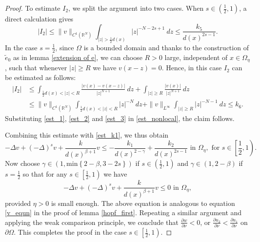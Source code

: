 \documentclass[reqno,oneside]{amsart}
\theoremstyle{definition}
\theoremstyle{remark}
\numberwithin{equation}{section}
\newcommand{\ba}{\beta}
\newcommand{\Om} {\Omega}
\newcommand{\pa}{\partial}
\newcommand{\sr}{\mathbb{R}}
\newcommand{\De} {\Delta}
\begin{document}
\begin{proof}
    To estimate $I_2$, we split the argument into two cases. When $s\in \left(\frac{1}{2},1\right)$, a direct calculation gives
    \begin{equation}\label{est_2}
        |I_2| \leq \|v\|_{C^1(\sr^N)} \int_{|z|>\frac{1}{2}d(x)} |z|^{-N-2s+1}\ dz \leq \frac{k_5}{d(x)^{2s-1}}.
    \end{equation}
    In the case $s= \frac{1}{2}$, since $\Om$ is a bounded domain and thanks to the construction of $\tilde{e}_0$ as in lemma \ref{extension of e}, we can choose $R>0$ large, independent of $x\in\Om_{\eta}$, such that whenever $|z|\geq R$ we have $v(x-z)=0$. Hence, in this case $I_2$ can be estimated as follows:
    \begin{align}\label{est_3}
        |I_2| &\leq \int_{\frac{1}{2}d(x) < |z| < R} \frac{|v(x) - v(x-z)|}{|z|^{N+1}}\ dz + \int_{|z|\geq R} \frac{|v(x)|}{|z|^{N+1}}\ dz\nonumber\\
        &\leq \|v\|_{C^1 (\sr^N)} \int_{\frac{1}{2}d(x) < |z| <R} |z|^{-N}\ dz + \|v\|_{L^{\infty}} \int_{|z|\geq R} |z|^{-N-1}\ dz \leq k_6.
    \end{align}
    Substituting \eqref{est_1}, \eqref{est_2} and \eqref{est_3} in \eqref{est_nonlocal}, the claim follows.

    Combining this estimate with \eqref{est_k1}, we thus obtain
    \begin{equation}\label{v_equn_second}
        -\Delta v + (-\De)^s v + \frac{k}{d(x)^{\ba +1}} v \leq - \frac{k_1}{d(x)^{2-\gamma}} + \frac{k_2}{d(x)^{2s-1}} \text{ in } \Om_{\eta}, \text{ for } s\in \left[\frac{1}{2},1 \right).
    \end{equation}
    Now choose $\gamma \in \left(1, \text{min} \left\{ 2-\beta, 3-2s \right\} \right)$ if $s\in \left(\frac{1}{2},1 \right)$ and $\gamma \in (1, 2- \ba)$ if $s= \frac{1}{2}$ so that for any $s\in \left[ \frac{1}{2}, 1 \right)$ we have
    \begin{equation}\label{v_equn_third}
        -\Delta v + (-\De)^s v + \frac{k}{d(x)^{\ba +1}} v \leq 0 \text{ in } \Om_{\eta},
    \end{equation}
    provided $\eta>0$ is small enough. The above equation is analogous to equation \eqref{v_equn} in the proof of lemma \ref{hopf_first}. Repeating a similar argument and applying the weak comparison principle, we conclude that $\frac{\pa w}{\pa \nu}<0$, or $\frac{\pa u_2}{\pa\nu} < \frac{\pa u_1}{\pa\nu}$ on $\pa\Om$. This completes the proof in the case $s\in \left[ \frac{1}{2},1 \right)$.
\end{proof}
\end{document}
